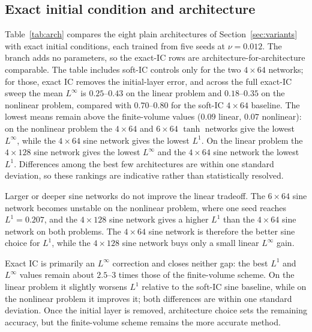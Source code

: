 \documentclass[11pt]{article}
\begin{document}
\subsection{Exact initial condition and architecture}
\label{sec:arch}
Table~\ref{tab:arch} compares the eight plain architectures of
Section~\ref{sec:variants} with exact initial conditions, each trained from
five seeds at $\nu=0.012$. The branch adds no parameters, so the exact-IC rows
are architecture-for-architecture comparable. The table includes soft-IC
controls only for the two $4\times64$ networks; for those, exact IC removes the
initial-layer error, and across the full exact-IC sweep the mean $L^\infty$ is
$0.25$--$0.43$ on the linear problem and $0.18$--$0.35$ on the nonlinear
problem, compared with $0.70$--$0.80$ for the soft-IC $4\times64$ baseline. The
lowest means remain above the finite-volume values ($0.09$
linear, $0.07$ nonlinear): on the nonlinear problem the $4\times64$ and
$6\times64$ $\tanh$ networks give the lowest $L^\infty$, while the $4\times64$
sine network gives the lowest $L^1$. On the linear problem the $4\times128$
sine network gives the lowest $L^\infty$ and the $4\times64$ sine network the
lowest $L^1$. Differences among the best few architectures are within one
standard deviation, so these rankings are indicative rather than
statistically resolved.

Larger or deeper sine networks do not improve the linear tradeoff. The
$6\times64$ sine network becomes unstable on the nonlinear problem, where one
seed reaches $L^1=0.207$, and the $4\times128$ sine network gives a higher
$L^1$ than the $4\times64$ sine network on both problems. The $4\times64$ sine
network is therefore the better sine choice for $L^1$, while the $4\times128$
sine network buys only a small linear $L^\infty$ gain.

Exact IC is primarily an $L^\infty$ correction and closes neither gap: the
best $L^1$ and $L^\infty$ values remain about $2.5$--$3$ times those of the
finite-volume scheme. On the linear problem it slightly worsens $L^1$ relative
to the soft-IC sine baseline, while on the nonlinear problem it improves it;
both differences are within one standard deviation. Once the initial layer is
removed, architecture choice sets the remaining
accuracy, but the finite-volume scheme remains the more accurate method.
\end{document}
